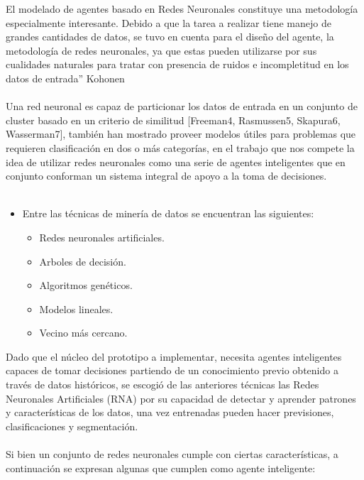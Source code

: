 El modelado de agentes basado en Redes Neuronales constituye una metodología especialmente interesante. Debido a que la tarea a realizar tiene manejo de grandes cantidades de datos, se tuvo en cuenta para el diseño del agente, la metodología de redes neuronales, ya que estas pueden utilizarse por sus cualidades naturales para tratar con presencia de ruidos e incompletitud en los datos de entrada” Kohonen
\\\\
Una red neuronal es capaz de particionar los datos de entrada en un conjunto de cluster basado en un criterio de similitud [Freeman4, Rasmussen5, Skapura6, Wasserman7], también han mostrado proveer modelos útiles para problemas que requieren clasificación en dos o más categorías, en el trabajo que nos compete la idea  de utilizar redes neuronales como una serie de agentes inteligentes que en conjunto conforman un sistema integral de apoyo a la toma de decisiones.
\\\\
\begin{itemize}
\item {Entre las técnicas de minería de datos se encuentran las siguientes:
		\begin{itemize}
			\item Redes neuronales artificiales.
			\item Arboles de decisión. 
			\item Algoritmos genéticos.
			\item Modelos lineales.
			\item Vecino más cercano.	
		\end{itemize}
	}
\end{itemize}	
Dado que el núcleo del prototipo a implementar, necesita agentes inteligentes capaces de tomar decisiones partiendo de un conocimiento previo obtenido a través de datos históricos, se escogió de las anteriores técnicas las Redes Neuronales Artificiales (RNA) por su capacidad de detectar y aprender patrones y características de los datos, una vez entrenadas pueden hacer previsiones, clasificaciones y segmentación.
\\\\
Si bien un conjunto de redes neuronales cumple con ciertas características, a continuación se expresan algunas que cumplen como agente inteligente:
\\
